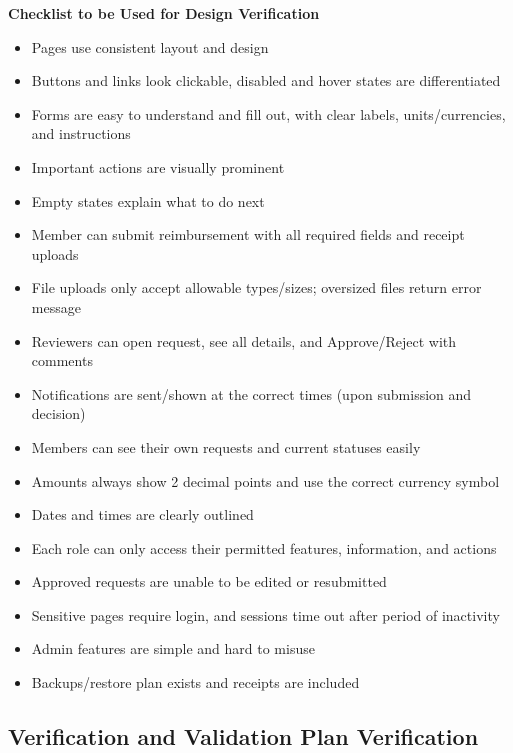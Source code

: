 \documentclass[12pt, titlepage]{article}
\begin{document}
\noindent\textbf{Checklist to be Used for Design Verification} \\
\begin{itemize}
  \item Pages use consistent layout and design
  \item Buttons and links look clickable, disabled and hover states are differentiated
  \item Forms are easy to understand and fill out, with clear labels, units/currencies, and instructions
  \item Important actions are visually prominent
  \item Empty states explain what to do next
  \item Member can submit reimbursement with all required fields and receipt uploads
  \item File uploads only accept allowable types/sizes; oversized files return error message
  \item Reviewers can open request, see all details, and Approve/Reject with comments 
  \item Notifications are sent/shown at the correct times (upon submission and decision)
  \item Members can see their own requests and current statuses easily 
  \item Amounts always show 2 decimal points and use the correct currency symbol
  \item Dates and times are clearly outlined 
  \item Each role can only access their permitted features, information, and actions
  \item Approved requests are unable to be edited or resubmitted
  \item Sensitive pages require login, and sessions time out after period of inactivity
  \item Admin features are simple and hard to misuse
  \item Backups/restore plan exists and receipts are included
\end{itemize}

\subsection{Verification and Validation Plan Verification}

\end{document}
